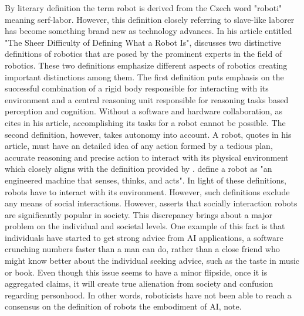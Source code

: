 \documentclass[man]{apa6}
\begin{document}
By literary definition the term robot is derived from the Czech word "roboti" meaning serf-labor. 
However, this definition closely referring to slave-like laborer has become something brand new as technology advances.
In his article entitled "The Sheer Difficulty of Defining What a Robot Is",  discusses two distinctive definitions of robotics that are posed by the prominent experts in the field of robotics.
These two definitions emphasize different aspects of robotics creating important distinctions among them.
The first definition puts emphasis on the successful combination of a rigid body responsible for interacting with its environment and a central reasoning unit responsible for reasoning tasks based perception and cognition.
Without a software and hardware collaboration, as  cites in his article, accomplishing its tasks for a robot cannot be possible.
The second definition, however, takes autonomy into account.
A robot,  quotes in his article, must have an detailed idea of any action formed by a tedious plan, accurate reasoning and precise action to interact with its physical environment which closely aligns with the definition provided by \cite{lin}. 
\citeauthor{lin} \citeyear[p.~943]{lin} define a robot as "an engineered machine that senses, thinks, and acts".
In light of these definitions, robots have to interact with its environment. However, such definitions exclude any means of social interactions.
However,  asserts that socially interaction robots are significantly popular in society.
This discrepancy brings about a major problem on the individual and societal levels.
One example of this fact is that individuals have started to get strong advice from AI applications, a software crunching numbers faster than a man can do, rather than a close friend who might know better about the individual seeking advice, such as the taste in music or book.
Even though this issue seems to have a minor flipside, once it is aggregated  claims, it will create true alienation from society and confusion regarding personhood.
In other words, roboticists have not been able  to reach a consensus on the definition of robots the embodiment of AI,  note.
\par
\end{document}
